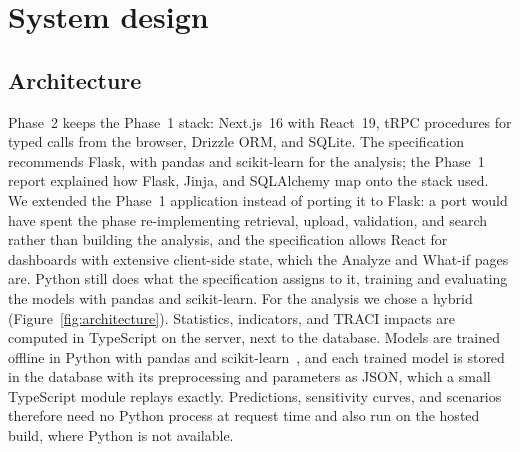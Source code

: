 \documentclass[11pt,a4paper]{article}
\begin{document}
\section{System design}
\label{sec:design}

\subsection{Architecture}

Phase~2 keeps the Phase~1 stack: Next.js~16 with React~19, tRPC procedures for typed calls from
the browser, Drizzle ORM, and SQLite. The specification recommends Flask, with pandas and
scikit-learn for the analysis; the Phase~1 report explained how Flask, Jinja, and SQLAlchemy map
onto the stack used. We extended the Phase~1 application instead of porting it to Flask: a port
would have spent the phase re-implementing retrieval, upload, validation, and search rather than
building the analysis, and the specification allows React for dashboards with extensive
client-side state, which the Analyze and What-if pages are. Python still does what the
specification assigns to it, training and evaluating the models with pandas and scikit-learn.
For the analysis we chose a hybrid (Figure~\ref{fig:architecture}).
Statistics, indicators, and TRACI impacts are computed in TypeScript on the server, next to the
database. Models are trained offline in Python with pandas and
scikit-learn~\cite{pedregosa2011sklearn}, and each trained model is stored in the database with
its preprocessing and parameters as JSON, which a small TypeScript module replays exactly.
Predictions, sensitivity curves, and scenarios therefore need no Python process at request time
and also run on the hosted build, where Python is not available.
\end{document}
